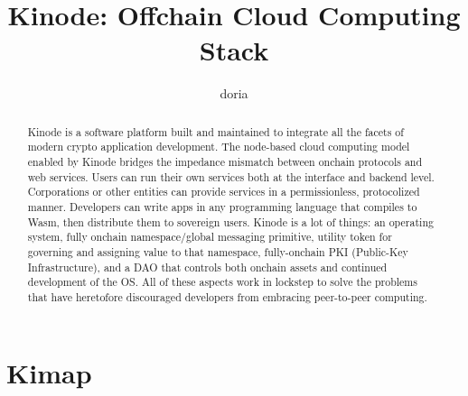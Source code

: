 \documentclass[runningheads]{llncs}
\begin{document}
%
\title{Kinode: Offchain Cloud Computing Stack}
%
%
\author{doria %
}
%
%
\institute{ }
%
\maketitle              %
%
\begin{abstract}
Kinode is a software platform built and maintained to integrate all the facets of modern crypto application development.
The node-based cloud computing model enabled by Kinode bridges the impedance mismatch between onchain protocols and web services.
Users can run their own services both at the interface and backend level.
Corporations or other entities can provide services in a permissionless, protocolized manner.
Developers can write apps in any programming language that compiles to Wasm, then distribute them to sovereign users.
Kinode is a lot of things: an operating system, fully onchain namespace/global messaging primitive, utility token for governing and assigning value to that namespace, fully-onchain PKI (Public-Key Infrastructure), and a DAO that controls both onchain assets and continued development of the OS.
All of these aspects work in lockstep to solve the problems that have heretofore discouraged developers from embracing peer-to-peer computing.

\end{abstract}
%
%
%
\tableofcontents
\newpage
%
%
%
\section{Kimap}
\end{document}
